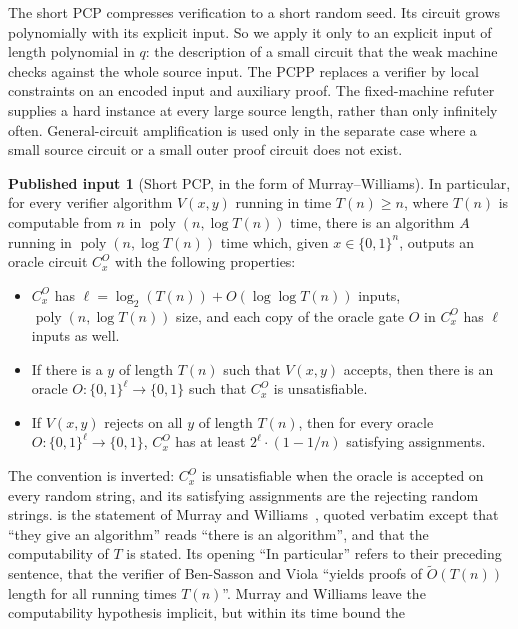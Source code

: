 \documentclass[11pt,letterpaper]{article}
\theoremstyle{definition}
\newtheorem{import}[theorem]{Published input}
\theoremstyle{remark}
\newcommand{\poly}{\operatorname{poly}}
\begin{document}
The short PCP compresses verification to a short random seed. Its
circuit grows polynomially with its explicit input. So we apply it only
to an explicit input of length polynomial in \(q\): the description of
a small circuit that the weak machine checks against the whole source
input. The PCPP replaces a verifier by local constraints on an encoded
input and auxiliary proof. The fixed-machine refuter supplies a
hard instance at every large source length, rather than only
infinitely often. General-circuit amplification is used only in
the separate case where a small source circuit or a small outer proof
circuit does not exist.

\begin{import}[Short PCP, in the form of Murray--Williams]\label{imp:short-pcp}
In particular, for every verifier algorithm \(V(x,y)\) running in time
\(T(n)\ge n\), where \(T(n)\) is computable from \(n\) in
\(\poly(n,\log T(n))\) time, there is an algorithm \(A\) running in
\(\poly(n,\log T(n))\) time which, given \(x\in\{0,1\}^n\), outputs an
oracle circuit \(C^O_x\) with the following properties:
\begin{itemize}
\item \(C^O_x\) has \(\ell=\log_2(T(n))+O(\log\log T(n))\) inputs,
\(\poly(n,\log T(n))\) size, and each copy of the oracle gate \(O\) in
\(C^O_x\) has \(\ell\) inputs as well.
\item If there is a \(y\) of length \(T(n)\) such that \(V(x,y)\)
accepts, then there is an oracle \(O:\{0,1\}^\ell\to\{0,1\}\) such that
\(C^O_x\) is unsatisfiable.
\item If \(V(x,y)\) rejects on all \(y\) of length \(T(n)\), then for
every oracle \(O:\{0,1\}^\ell\to\{0,1\}\), \(C^O_x\) has at least
\(2^\ell\cdot(1-1/n)\) satisfying assignments.
\end{itemize}
\end{import}
The convention is inverted: \(C^O_x\) is unsatisfiable when the oracle
is accepted on every random string, and its satisfying assignments are
the rejecting random strings.
 is the statement of Murray and Williams~\cite[Section~5, in the
proof of Theorem~1.4]{MW20}, quoted verbatim
except that ``they give an algorithm'' reads ``there is an algorithm'',
and that the computability of \(T\) is stated. Its opening ``In
particular'' refers to their preceding sentence, that the verifier of
Ben-Sasson and Viola ``yields proofs of \(\tilde O(T(n))\) length for all
running times \(T(n)\)''. Murray and Williams leave
the computability hypothesis implicit, but within its time bound the
\end{document}
